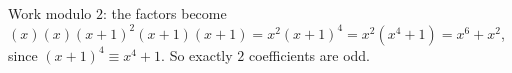 Work modulo $2$: the factors become $(x)(x)(x+1)^2(x+1)(x+1)=x^2(x+1)^4=x^2(x^4+1)=x^6+x^2$, since $(x+1)^4\equiv x^4+1$. So exactly $\boxed{2}$ coefficients are odd.
